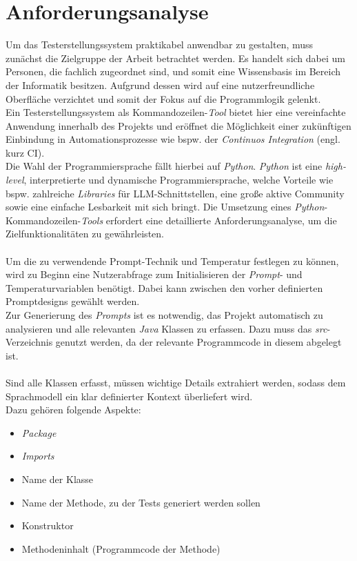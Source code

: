 \section{Anforderungsanalyse}\label{section:anford}
Um das Testerstellungssystem praktikabel anwendbar zu gestalten, muss zunächst die Zielgruppe der Arbeit betrachtet werden. Es handelt sich dabei um Personen, die fachlich zugeordnet sind, und somit eine Wissensbasis im Bereich der Informatik besitzen. Aufgrund dessen wird auf eine nutzerfreundliche Oberfläche verzichtet und somit der Fokus auf die Programmlogik gelenkt.\\ Ein Testerstellungssystem als Kommandozeilen-\textit{Tool} bietet hier eine vereinfachte Anwendung innerhalb des Projekts und eröffnet die Möglichkeit einer zukünftigen Einbindung in Automationsprozesse wie bspw. der \textit{Continuos Integration} (engl. kurz CI).\\ Die Wahl der Programmiersprache fällt hierbei auf \textit{Python}. \textit{Python} ist eine \textit{high-level}, interpretierte und dynamische Programmiersprache, welche Vorteile wie bspw. zahlreiche \textit{Libraries} für LLM-Schnittstellen, eine große aktive Community sowie eine einfache Lesbarkeit mit sich bringt. \cite*{PythonLanguageAdvantages2017} Die Umsetzung eines \textit{Python}-Kommandozeilen-\textit{Tools} erfordert eine detaillierte Anforderungsanalyse, um die Zielfunktionalitäten zu gewährleisten.\\\\
Um die zu verwendende Prompt-Technik und Temperatur festlegen zu können, wird zu Beginn eine Nutzerabfrage zum Initialisieren der \textit{Prompt}- und Temperaturvariablen benötigt. Dabei kann zwischen den vorher definierten Promptdesigns gewählt werden. \\ Zur Generierung des \textit{Prompts} ist es notwendig, das Projekt automatisch zu analysieren und alle relevanten \textit{Java} Klassen zu erfassen. Dazu muss das \textit{src}-Verzeichnis genutzt werden, da der relevante Programmcode in diesem abgelegt ist.\\\\ Sind alle Klassen erfasst, müssen wichtige Details extrahiert werden, sodass dem Sprachmodell ein klar definierter Kontext überliefert wird.\\ Dazu gehören folgende Aspekte:
\begin{itemize}
    \setlength{\parskip}{1pt}
    \item \textit{Package}
    \item \textit{Imports}
    \item Name der Klasse
    \item Name der Methode, zu der Tests generiert werden sollen
    \item Konstruktor
    \item Methodeninhalt (Programmcode der Methode)
\end{itemize}
